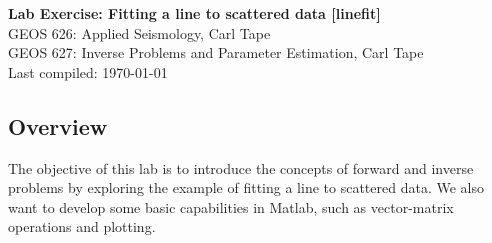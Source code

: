 \documentclass[11pt,titlepage,fleqn]{article}
\begin{document}

\begin{spacing}{1.2}
\centering
{\large \bf Lab Exercise: Fitting a line to scattered data [linefit]} \\
GEOS 626: Applied Seismology, Carl Tape \\
GEOS 627: Inverse Problems and Parameter Estimation, Carl Tape \\
Last compiled: \today
\end{spacing}


\vspace{-0.5cm}
\subsection*{Overview}

The objective of this lab is to introduce the concepts of forward and inverse problems by exploring the example of fitting a line to scattered data. We also want to develop some basic capabilities in Matlab, such as vector-matrix operations and plotting.
\end{document}
